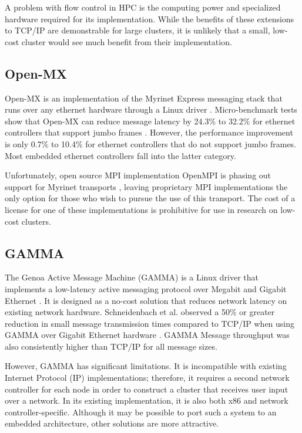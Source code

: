 \documentclass[11pt]{book}
\begin{document}
A problem with flow control in HPC is the computing power and specialized
hardware required for its implementation. While the benefits of these extensions
to TCP/IP are demonstrable for large clusters, it is unlikely that a small,
low-cost cluster would see much benefit from their implementation.

\subsection{\textbf{Open-MX}}

Open-MX is an implementation of the Myrinet Express messaging stack that runs
over any ethernet hardware through a Linux driver
\cite{goglin-08}. Micro-benchmark tests show that Open-MX can reduce message
latency by 24.3\% to 32.2\% for ethernet controllers that support jumbo frames
\cite{goglin-11}. However, the performance improvement is only 0.7\% to 10.4\%
for ethernet controllers that do not support jumbo frames. Most embedded
ethernet controllers fall into the latter category.

Unfortunately, open source MPI implementation OpenMPI is phasing out support for
Myrinet transports \cite{openmpi-myrinet}, leaving proprietary MPI implementations
the only option for those who wish to pursue the use of this transport. The cost
of a license for one of these implementations is prohibitive for use in research
on low-cost clusters.

\subsection{\textbf{GAMMA}}

The Genoa Active Message Machine (GAMMA) is a Linux driver that implements a
low-latency active messaging protocol over Megabit and Gigabit Ethernet
\cite{gamma}. It is designed as a no-cost solution that reduces network latency
on existing network hardware. Schneidenbach et al. observed a 50\% or greater
reduction in small message transmission times compared to TCP/IP when using
GAMMA over Gigabit Ethernet hardware \cite{schneidenbach-03}. GAMMA
Message throughput was also consistently higher than TCP/IP for all message
sizes.

However, GAMMA has significant limitations. It is incompatible with existing
Internet Protocol (IP) implementations; therefore, it requires a second network
controller for each node in order to construct a cluster that receives user
input over a network. In its existing implementation, it is also both x86 and
network controller-specific. Although it may be possible to port such a system
to an embedded architecture, other solutions are more attractive.
\end{document}

